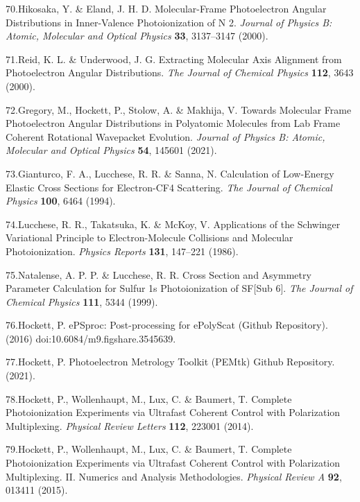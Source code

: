 \documentclass[10pt]{article}
\begin{document}
\label{csl:70}70.Hikosaka, Y. \& Eland, J. H. D. {Molecular-Frame Photoelectron Angular Distributions in Inner-Valence Photoionization of {{N}} 2}. \textit{Journal of Physics B: Atomic, Molecular and Optical Physics} \textbf{33}, 3137–3147 (2000).

\label{csl:71}71.Reid, K. L. \& Underwood, J. G. {Extracting Molecular Axis Alignment from Photoelectron Angular Distributions}. \textit{The Journal of Chemical Physics} \textbf{112}, 3643 (2000).

\label{csl:72}72.Gregory, M., Hockett, P., Stolow, A. \& Makhija, V. {Towards Molecular Frame Photoelectron Angular Distributions in Polyatomic Molecules from Lab Frame Coherent Rotational Wavepacket Evolution}. \textit{Journal of Physics B: Atomic, Molecular and Optical Physics} \textbf{54}, 145601 (2021).

\label{csl:73}73.Gianturco, F. A., Lucchese, R. R. \& Sanna, N. {Calculation of Low-Energy Elastic Cross Sections for Electron-{{CF4}} Scattering}. \textit{The Journal of Chemical Physics} \textbf{100}, 6464 (1994).

\label{csl:74}74.Lucchese, R. R., Takatsuka, K. \& McKoy, V. {Applications of the {{Schwinger}} Variational Principle to Electron-Molecule Collisions and Molecular Photoionization}. \textit{Physics Reports} \textbf{131}, 147–221 (1986).

\label{csl:75}75.Natalense, A. P. P. \& Lucchese, R. R. {Cross Section and Asymmetry Parameter Calculation for Sulfur 1s Photoionization of {{SF}}[Sub 6]}. \textit{The Journal of Chemical Physics} \textbf{111}, 5344 (1999).

\label{csl:76}76.Hockett, P. {{{ePSproc}}: {{Post-processing}} for {{ePolyScat}} ({{Github}} Repository)}. (2016) doi:10.6084/m9.figshare.3545639.

\label{csl:77}77.Hockett, P. {Photoelectron {{Metrology Toolkit}} ({{PEMtk}}) {{Github}} Repository}. (2021).

\label{csl:78}78.Hockett, P., Wollenhaupt, M., Lux, C. \& Baumert, T. {Complete {{Photoionization Experiments}} via {{Ultrafast Coherent Control}} with {{Polarization Multiplexing}}}. \textit{Physical Review Letters} \textbf{112}, 223001 (2014).

\label{csl:79}79.Hockett, P., Wollenhaupt, M., Lux, C. \& Baumert, T. {Complete Photoionization Experiments via Ultrafast Coherent Control with Polarization Multiplexing. {{II}}. {{Numerics}} and Analysis Methodologies}. \textit{Physical Review A} \textbf{92}, 013411 (2015).
\end{document}
